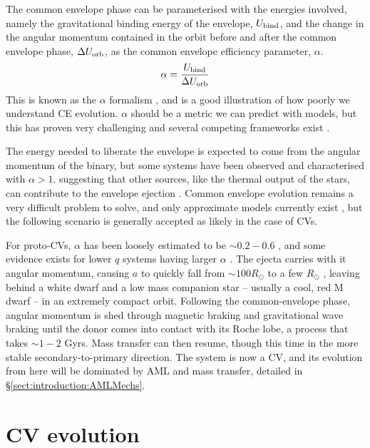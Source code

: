 The common envelope phase can be parameterised with the energies involved, namely the gravitational binding energy of the envelope, $U_{\rm bind}$, and the change in the angular momentum contained in the orbit before and after the common envelope phase, $\Delta U_{\rm orb}$, as the common envelope efficiency parameter, $\alpha$.
\begin{equation}
    \alpha = \frac{U_{\rm bind}}{\Delta U_{\rm orb}}
\end{equation}
This is known as the $\alpha$ formalism \citep{demarco2011}, and is a good illustration of how poorly we understand CE evolution. $\alpha$ should be a metric we can predict with models, but this has proven very challenging and several competing frameworks exist \citep{ivanova2020}. 

The energy needed to liberate the envelope is expected to come from the angular momentum of the binary, but some systems have been observed and characterised with $\alpha > 1$. suggesting that other sources, like the thermal output of the stars, can contribute to the envelope ejection \citep{demarco2011, ivanova2013}. Common envelope evolution remains a very difficult problem to solve, and only approximate models currently exist \citep{ivanova2020}, but the following scenario is generally accepted as likely in the case of CVs.

For proto-CVs, $\alpha$ has been loosely estimated to be $\sim 0.2 - 0.6$ \citep{politano2007}, and some evidence exists for lower $q$ systems having larger $\alpha$ \citep{passy2013}. The ejecta carries with it angular momentum, causing $a$ to quickly fall from $\sim 100 R_\odot$ to a few $R_\odot$ \citep{politano2007}, leaving behind a white dwarf and a low mass companion star -- usually a cool, red M dwarf -- in an extremely compact orbit. 
Following the common-envelope phase, angular momentum is shed through magnetic braking and gravitational wave braking until the donor comes into contact with its Roche lobe, a process that takes $\sim 1-2$ Gyrs. Mass transfer can then resume, though this time in the more stable secondary-to-primary direction. The system is now a CV, and its evolution from here will be dominated by AML and mass transfer, detailed in \S\ref{sect:introduction:AMLMechs}.



\section{CV evolution}
\label{sect:introduction:Summary of how AML and Mdot drive period evolution}

